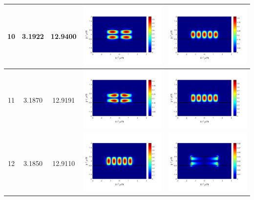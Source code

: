 \documentclass{assignment}
\begin{document}
\begin{sol}
\begin{itemize}
\begin{longtable}[c]{|c|c|c|c|c|}
            10 & 3.1922 & 12.9400 & \includegraphics[width=.3\columnwidth]{Assignment-2-mode-10-Ex.png} & \includegraphics[width=.3\columnwidth]{Assignment-2-mode-10-Ey.png} \\ \hline
            11 & 3.1870 & 12.9191 & \includegraphics[width=.3\columnwidth]{Assignment-2-mode-11-Ex.png} & \includegraphics[width=.3\columnwidth]{Assignment-2-mode-11-Ey.png} \\ \hline
            12 & 3.1850 & 12.9110 & \includegraphics[width=.3\columnwidth]{Assignment-2-mode-12-Ex.png} & \includegraphics[width=.3\columnwidth]{Assignment-2-mode-12-Ey.png} \\ \hline

\end{longtable}
\end{itemize}
\end{sol}
\end{document}
